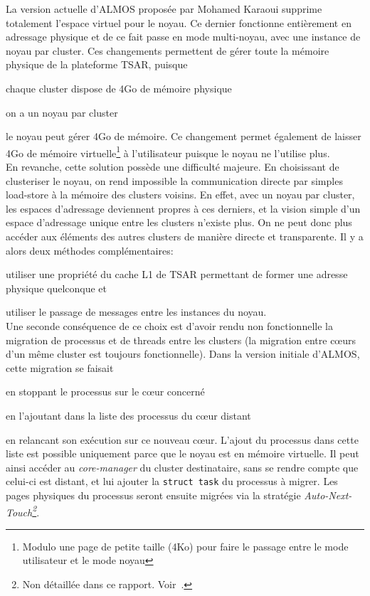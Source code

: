     La version actuelle d'ALMOS proposée par Mohamed Karaoui supprime totalement
    l'espace virtuel pour le noyau. Ce dernier fonctionne entièrement en
    adressage physique et de ce fait passe en mode multi-noyau, avec une
    instance de noyau par cluster. Ces changements permettent de gérer toute la
    mémoire physique de la plateforme TSAR, puisque \benumline \item chaque
    cluster dispose de 4Go de mémoire physique \item on a un noyau par
    cluster \item le noyau peut gérer 4Go de mémoire\eenumline. Ce changement
    permet également de laisser 4Go de mémoire virtuelle\footnote{Modulo une
      page de petite taille (4Ko) pour faire le passage entre le mode
      utilisateur et le mode noyau} à l'utilisateur puisque le noyau ne
    l'utilise plus.\\

    En revanche, cette solution possède une difficulté majeure. En choisissant
    de clusteriser le noyau, on rend impossible la communication directe par
    simples load-store à la mémoire des clusters voisins. En effet, avec un
    noyau par cluster, les espaces d'adressage deviennent propres à ces
    derniers, et la vision simple d'un espace d'adressage unique entre les
    clusters n'existe plus. On ne peut donc plus accéder aux éléments des autres
    clusters de manière directe et transparente. Il y a alors deux méthodes
    complémentaires:\benumline \item utiliser une propriété du cache L1 de TSAR
    permettant de former une adresse physique quelconque et \item utiliser le
    passage de messages entre les instances du noyau\eenumline.\\

    Une seconde conséquence de ce choix est d'avoir rendu non fonctionnelle la
    migration de processus et de threads entre les clusters (la migration entre
    c\oe urs d'un même cluster est toujours fonctionnelle). Dans la version
    initiale d'ALMOS, cette migration se faisait\benumline \item en stoppant le
    processus sur le c\oe ur concerné \item en l'ajoutant dans la liste des
    processus du c\oe ur distant \item en relancant son exécution sur ce nouveau
    c\oe ur\eenumline. L'ajout du processus dans cette liste est possible
    uniquement parce que le noyau est en mémoire virtuelle. Il peut ainsi
    accéder au \textit{core-manager} du cluster destinataire, sans se rendre
    compte que celui-ci est distant, et lui ajouter la \texttt{struct task} du
    processus à migrer. Les pages physiques du processus seront ensuite migrées
    via la stratégie \textit{Auto-Next-Touch\footnote{Non détaillée dans ce
        rapport. Voir~\citep{almaless2014universite}.}}.

